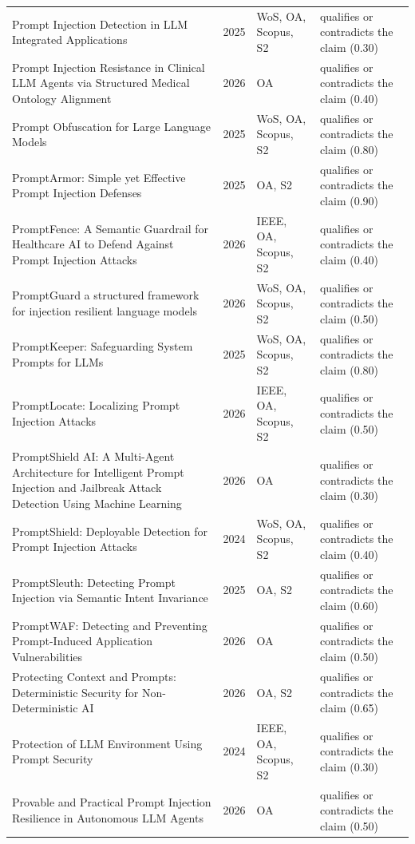 \begin{longtable}{@{}%
  >{\raggedright\arraybackslash}p{}c%
  >{\raggedright\arraybackslash}p{}%
  >{\raggedright\arraybackslash}p{}@{}}
Prompt Injection Detection in LLM Integrated Applications & 2025 & WoS, OA, Scopus, S2 & qualifies or contradicts the claim (0.30) \\
Prompt Injection Resistance in Clinical LLM Agents via Structured Medical Ontology Alignment & 2026 & OA & qualifies or contradicts the claim (0.40) \\
Prompt Obfuscation for Large Language Models & 2025 & WoS, OA, Scopus, S2 & qualifies or contradicts the claim (0.80) \\
PromptArmor: Simple yet Effective Prompt Injection Defenses & 2025 & OA, S2 & qualifies or contradicts the claim (0.90) \\
PromptFence: A Semantic Guardrail for Healthcare AI to Defend Against Prompt Injection Attacks & 2026 & IEEE, OA, Scopus, S2 & qualifies or contradicts the claim (0.40) \\
PromptGuard a structured framework for injection resilient language models & 2026 & WoS, OA, Scopus, S2 & qualifies or contradicts the claim (0.50) \\
PromptKeeper: Safeguarding System Prompts for LLMs & 2025 & WoS, OA, Scopus, S2 & qualifies or contradicts the claim (0.80) \\
PromptLocate: Localizing Prompt Injection Attacks & 2026 & IEEE, OA, Scopus, S2 & qualifies or contradicts the claim (0.50) \\
PromptShield AI: A Multi-Agent Architecture for Intelligent Prompt Injection and Jailbreak Attack Detection Using Machine Learning & 2026 & OA & qualifies or contradicts the claim (0.30) \\
PromptShield: Deployable Detection for Prompt Injection Attacks & 2024 & WoS, OA, Scopus, S2 & qualifies or contradicts the claim (0.40) \\
PromptSleuth: Detecting Prompt Injection via Semantic Intent Invariance & 2025 & OA, S2 & qualifies or contradicts the claim (0.60) \\
PromptWAF: Detecting and Preventing Prompt-Induced Application Vulnerabilities & 2026 & OA & qualifies or contradicts the claim (0.50) \\
Protecting Context and Prompts: Deterministic Security for Non-Deterministic AI & 2026 & OA, S2 & qualifies or contradicts the claim (0.65) \\
Protection of LLM Environment Using Prompt Security & 2024 & IEEE, OA, Scopus, S2 & qualifies or contradicts the claim (0.30) \\
Provable and Practical Prompt Injection Resilience in Autonomous LLM Agents & 2026 & OA & qualifies or contradicts the claim (0.50) \\

\end{longtable}
